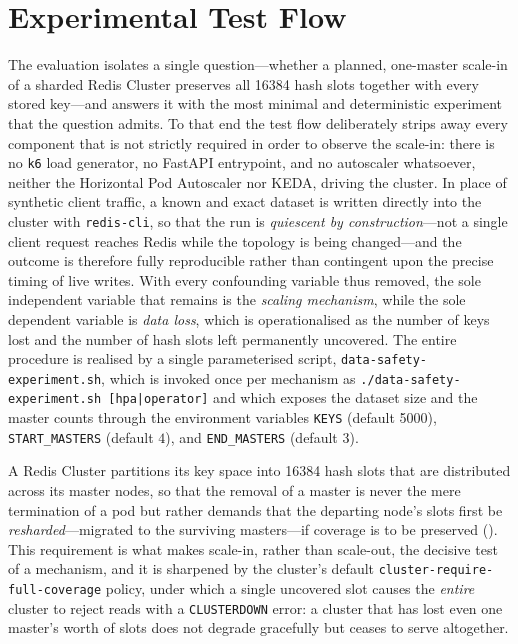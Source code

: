 \section{Experimental Test Flow}\label{sec:test-flow}

The evaluation isolates a single question---whether a planned, one-master scale-in of a
sharded Redis Cluster preserves all \num{16384} hash slots together with every stored
key---and answers it with the most minimal and deterministic experiment that the question
admits. To that end the test flow deliberately strips away every component that is not
strictly required in order to observe the scale-in: there is no \texttt{k6} load
generator, no FastAPI entrypoint, and no autoscaler whatsoever, neither the Horizontal Pod
Autoscaler nor KEDA, driving the cluster. In place of synthetic client traffic, a known
and exact dataset is written directly into the cluster with \texttt{redis-cli}, so that
the run is \emph{quiescent by construction}---not a single client request reaches Redis
while the topology is being changed---and the outcome is therefore fully reproducible
rather than contingent upon the precise timing of live writes. With every confounding
variable thus removed, the sole independent variable that remains is the \emph{scaling
mechanism}, while the sole dependent variable is \emph{data loss}, which is operationalised
as the number of keys lost and the number of hash slots left permanently uncovered. The
entire procedure is realised by a single parameterised script,
\texttt{data-safety-experiment.sh}, which is invoked once per mechanism as
\texttt{./data-safety-experiment.sh [hpa|operator]} and which exposes the dataset size and
the master counts through the environment variables \texttt{KEYS} (default \num{5000}),
\texttt{START\_MASTERS} (default $4$), and \texttt{END\_MASTERS} (default $3$).

A Redis Cluster partitions its key space into \num{16384} hash slots that are distributed
across its master nodes, so that the removal of a master is never the mere termination of a
pod but rather demands that the departing node's slots first be \emph{resharded}---migrated
to the surviving masters---if coverage is to be preserved (\cite{redis:clusterspec,redis:scaling}).
This requirement is what makes scale-in, rather than scale-out, the decisive test of a
mechanism, and it is sharpened by the cluster's default \texttt{cluster-require-full-cover\-age}
policy, under which a single uncovered slot causes the \emph{entire} cluster to reject reads
with a \texttt{CLUSTERDOWN} error: a cluster that has lost even one master's worth of slots
does not degrade gracefully but ceases to serve altogether.

